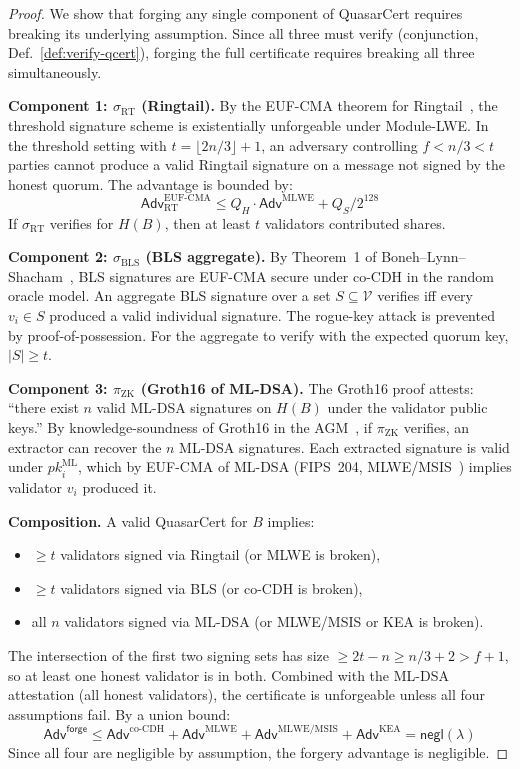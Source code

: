 \begin{proof}
We show that forging any single component of QuasarCert requires
breaking its underlying assumption.  Since all three must verify
(conjunction, Def.~\ref{def:verify-qcert}), forging the full
certificate requires breaking all three simultaneously.

\medskip
\textbf{Component 1: $\sigma_{\mathrm{RT}}$ (Ringtail).}
By the EUF-CMA theorem for Ringtail~\cite{ringtail}, the threshold
signature scheme is existentially unforgeable under Module-LWE.
In the threshold setting with $t = \lfloor 2n/3\rfloor+1$, an adversary
controlling $f < n/3 < t$ parties cannot produce a valid Ringtail
signature on a message not signed by the honest quorum.  The advantage
is bounded by:
\[
\mathsf{Adv}^{\text{EUF-CMA}}_{\text{RT}} \leq Q_H \cdot
\mathsf{Adv}^{\text{MLWE}} + Q_S / 2^{128}
\]
If $\sigma_{\mathrm{RT}}$ verifies for $H(B)$, then at least $t$
validators contributed shares.

\medskip
\textbf{Component 2: $\sigma_{\mathrm{BLS}}$ (BLS aggregate).}
By Theorem~1 of Boneh--Lynn--Shacham~\cite{boneh2001short}, BLS
signatures are EUF-CMA secure under co-CDH in the random oracle model.
An aggregate BLS signature over a set $S \subseteq \mathcal{V}$ verifies
iff every $v_i \in S$ produced a valid individual signature.  The
rogue-key attack is prevented by proof-of-possession.  For the aggregate
to verify with the expected quorum key, $|S| \geq t$.

\medskip
\textbf{Component 3: $\pi_{\mathrm{ZK}}$ (Groth16 of ML-DSA).}
The Groth16 proof attests: ``there exist $n$ valid ML-DSA signatures on
$H(B)$ under the validator public keys.''  By knowledge-soundness of
Groth16 in the AGM~\cite{groth2016}, if $\pi_{\mathrm{ZK}}$ verifies,
an extractor can recover the $n$ ML-DSA signatures.  Each extracted
signature is valid under $\mathit{pk}_i^{\mathrm{ML}}$, which by
EUF-CMA of ML-DSA (FIPS~204, MLWE/MSIS~\cite{nist-pqc}) implies
validator $v_i$ produced it.

\medskip
\textbf{Composition.}
A valid QuasarCert for $B$ implies:
\begin{itemize}[nosep]
  \item $\geq t$ validators signed via Ringtail (or MLWE is broken),
  \item $\geq t$ validators signed via BLS (or co-CDH is broken),
  \item all $n$ validators signed via ML-DSA (or MLWE/MSIS or KEA is
    broken).
\end{itemize}
The intersection of the first two signing sets has size
$\geq 2t - n \geq n/3 + 2 > f + 1$, so at least one honest validator
is in both.  Combined with the ML-DSA attestation (all honest
validators), the certificate is unforgeable unless all four assumptions
fail.  By a union bound:
\[
\mathsf{Adv}^{\mathsf{forge}} \leq
\mathsf{Adv}^{\text{co-CDH}} + \mathsf{Adv}^{\text{MLWE}} +
\mathsf{Adv}^{\text{MLWE/MSIS}} + \mathsf{Adv}^{\text{KEA}}
= \mathsf{negl}(\lambda)
\]
Since all four are negligible by assumption, the forgery advantage is
negligible.
\end{proof}

